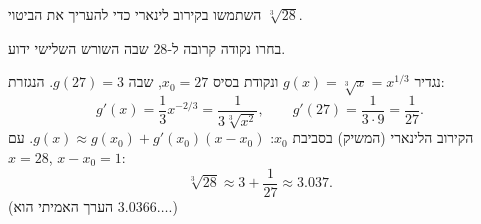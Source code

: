 
\begin{question}
השתמשו בקירוב לינארי כדי להעריך את הביטוי $\sqrt[3]{28}$.
\end{question}

\begin{hint}
בחרו נקודה קרובה ל-$28$ שבה השורש השלישי ידוע.
\end{hint}

\begin{solution}
נגדיר $g(x)=\sqrt[3]{x}=x^{1/3}$ ונקודת בסיס $x_0=27$, שבה $g(27)=3$. הנגזרת:
\[ g'(x)=\frac{1}{3}x^{-2/3}=\frac{1}{3\sqrt[3]{x^2}},\qquad g'(27)=\frac{1}{3\cdot 9}=\frac{1}{27}. \]
הקירוב הלינארי (המשיק) בסביבת $x_0$: $g(x)\approx g(x_0)+g'(x_0)(x-x_0)$. עם $x=28$, $x-x_0=1$:
\[ \sqrt[3]{28}\approx 3+\frac{1}{27}\approx 3.037. \]
(הערך האמיתי הוא $3.0366\ldots$.)
\end{solution}
